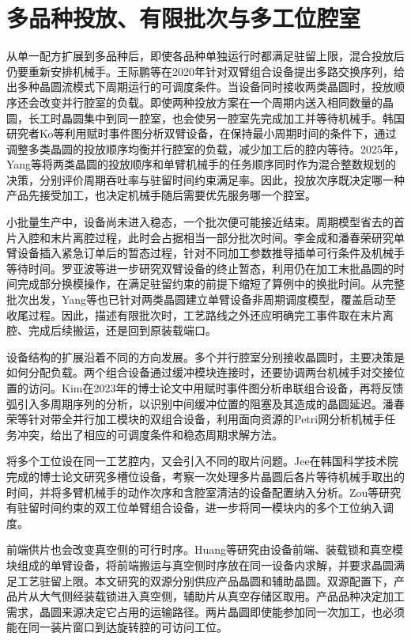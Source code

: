 \section{多品种投放、有限批次与多工位腔室}

从单一配方扩展到多品种后，即使各品种单独运行时都满足驻留上限，混合投放后仍要重新安排机械手。王际鹏等在2020年针对双臂组合设备提出多路交换序列，给出多种晶圆流模式下周期运行的可调度条件\citep{wang2020multiple}。当设备同时接收两类晶圆时，投放顺序还会改变并行腔室的负载。即使两种投放方案在一个周期内送入相同数量的晶圆，长工时晶圆集中到同一腔室，也会使另一腔室先完成加工并等待机械手。韩国研究者Ko等利用赋时事件图分析双臂设备，在保持最小周期时间的条件下，通过调整多类晶圆的投放顺序均衡并行腔室的负载，减少加工后的腔内等待\citep{ko2021balance}。2025年，Yang等将两类晶圆的投放顺序和单臂机械手的任务顺序同时作为混合整数规划的决策，分别评价周期吞吐率与驻留时间约束满足率\citep{yang2025miptwowafers}。因此，投放次序既决定哪一种产品先接受加工，也决定机械手随后需要优先服务哪一个腔室。

小批量生产中，设备尚未进入稳态，一个批次便可能接近结束。周期模型省去的首片入腔和末片离腔过程，此时会占据相当一部分批次时间。李金成和潘春荣研究单臂设备插入紧急订单后的暂态过程，针对不同加工参数推导插单可行条件及机械手等待时间\citep{li2023urgent}。罗亚波等进一步研究双臂设备的终止暂态，利用仍在加工末批晶圆的时间完成部分换模操作，在满足驻留约束的前提下缩短了算例中的换批时间\citep{luo2026mask}。从完整批次出发，Yang等也已针对两类晶圆建立单臂设备非周期调度模型，覆盖启动至收尾过程\citep{yang2025noncyclic}。因此，描述有限批次时，工艺路线之外还应明确完工事件取在末片离腔、完成后续搬运，还是回到原装载端口。

设备结构的扩展沿着不同的方向发展。多个并行腔室分别接收晶圆时，主要决策是如何分配负载。两个组合设备通过缓冲模块连接时，还要协调两台机械手对交接位置的访问。Kim在2023年的博士论文中用赋时事件图分析串联组合设备，再将反馈弧引入多周期序列的分析，以识别中间缓冲位置的阻塞及其造成的晶圆延迟\citep{kim2023tandemphd}。潘春荣等针对带全并行加工模块的双组合设备，利用面向资源的Petri网分析机械手任务冲突，给出了相应的可调度条件和稳态周期求解方法\citep{pan2024twin}。

将多个工位设在同一工艺腔内，又会引入不同的取片问题。Jee在韩国科学技术院完成的博士论文研究多槽位设备，考察一次处理多片晶圆后各片等待机械手取出的时间，并将多臂机械手的动作次序和含腔室清洁的设备配置纳入分析\citep{jee2021thesis}。Zou等研究有驻留时间约束的双工位单臂组合设备，进一步将同一模块内的多个工位纳入调度\citep{zou2024twospace}。

前端供片也会改变真空侧的可行时序。Huang等研究由设备前端、装载锁和真空模块组成的单臂设备，将前端搬运与真空侧时序放在同一设备内求解，并要求晶圆满足工艺驻留上限\citep{huang2025efem}。本文研究的双源分别供应产品晶圆和辅助晶圆。双源配置下，产品片从大气侧经装载锁进入真空侧，辅助片从真空存储区取用。产品品种决定加工需求，晶圆来源决定它占用的运输路径。两片晶圆即使能参加同一次加工，也必须能在同一装片窗口到达旋转腔的可访问工位。

